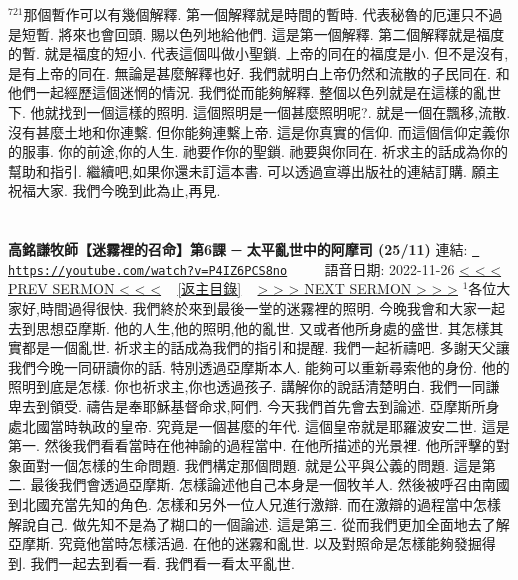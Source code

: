 \documentclass{book}
\begin{document}
$^{721}$那個暫作可以有幾個解釋.
第一個解釋就是時間的暫時.
代表秘魯的厄運只不過是短暫.
將來也會回頭.
賜以色列地給他們.
這是第一個解釋.
第二個解釋就是福度的暫.
就是福度的短小.
代表這個叫做小聖鎖.
上帝的同在的福度是小.
但不是沒有,是有上帝的同在.
無論是甚麼解釋也好.
我們就明白上帝仍然和流散的子民同在.
和他們一起經歷這個迷惘的情況.
我們從而能夠解釋.
整個以色列就是在這樣的亂世下.
他就找到一個這樣的照明.
這個照明是一個甚麼照明呢?.
就是一個在飄移,流散.
沒有甚麼土地和你連繫.
但你能夠連繫上帝.
這是你真實的信仰.
而這個信仰定義你的服事.
你的前途,你的人生.
祂要作你的聖鎖.
祂要與你同在.
祈求主的話成為你的幫助和指引.
繼續吧,如果你還未訂這本書.
可以透過宣導出版社的連結訂購.
願主祝福大家.
我們今晚到此為止,再見.
\newpage



\section{}
\label{sec:P4IZ6PCS8no}
\textbf{高銘謙牧師【迷霧裡的召命】第6課 ─ 太平亂世中的阿摩司 (25/11)}
\newline
\newline
連結: \href{https://youtube.com/watch?v=P4IZ6PCS8no}{\texttt{ https://youtube.com/watch?v=P4IZ6PCS8no}} ~~~~ 語音日期: 2022-11-26 
\newline
\newline
\hyperref[sec:FHx_k0UyGMs]{\small{< < < PREV SERMON < < <}}
~
\hyperref[sec:index]{\small{[返主目錄]}}
~
\hyperref[sec:Hhm2a_HII7A]{\small{> > > NEXT SERMON > > >}}
\newline
\newline
$^{1}$各位大家好,時間過得很快.
我們終於來到最後一堂的迷霧裡的照明.
今晚我會和大家一起去到思想亞摩斯.
他的人生,他的照明,他的亂世.
又或者他所身處的盛世.
其怎樣其實都是一個亂世.
祈求主的話成為我們的指引和提醒.
我們一起祈禱吧.
多謝天父讓我們今晚一同研讀你的話.
特別透過亞摩斯本人.
能夠可以重新尋索他的身份.
他的照明到底是怎樣.
你也祈求主,你也透過孩子.
講解你的說話清楚明白.
我們一同謙卑去到領受.
禱告是奉耶穌基督命求,阿們.
今天我們首先會去到論述.
亞摩斯所身處北國當時執政的皇帝.
究竟是一個甚麼的年代.
這個皇帝就是耶羅波安二世.
這是第一.
然後我們看看當時在他神諭的過程當中.
在他所描述的光景裡.
他所評擊的對象面對一個怎樣的生命問題.
我們構定那個問題.
就是公平與公義的問題.
這是第二.
最後我們會透過亞摩斯.
怎樣論述他自己本身是一個牧羊人.
然後被呼召由南國到北國充當先知的角色.
怎樣和另外一位人兄進行激辯.
而在激辯的過程當中怎樣解說自己.
做先知不是為了糊口的一個論述.
這是第三.
從而我們更加全面地去了解亞摩斯.
究竟他當時怎樣活過.
在他的迷霧和亂世.
以及對照命是怎樣能夠發掘得到.
我們一起去到看一看.
我們看一看太平亂世.
\end{document}
